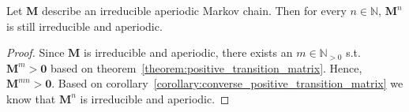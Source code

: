 \documentclass[../../main.tex]{subfiles}
\begin{document}

    \begin{lemma}
        \label{lemma:aperiodic_irreducible_stays_aperiodic}
        Let $\bm{M}$ describe an irreducible aperiodic Markov chain. Then for every $n \in \mathbb{N}$, $\bm{M}^n$ is still irreducible and aperiodic.
    \end{lemma}
    \vspace{-2.5em}
    \begin{proof}
        Since $\bm{M}$ is irreducible and aperiodic, there exists an $m \in \mathbb{N}_{>0}$ s.t. $\bm{M}^m > \bm{0}$ based on theorem~\ref{theorem:positive_transition_matrix}. Hence, $\bm{M}^{mn} > \bm{0}$. Based on corollary~\ref{corollary:converse_positive_transition_matrix} we know that $\bm{M}^n$ is irreducible and aperiodic.
    \end{proof}
\end{document}
